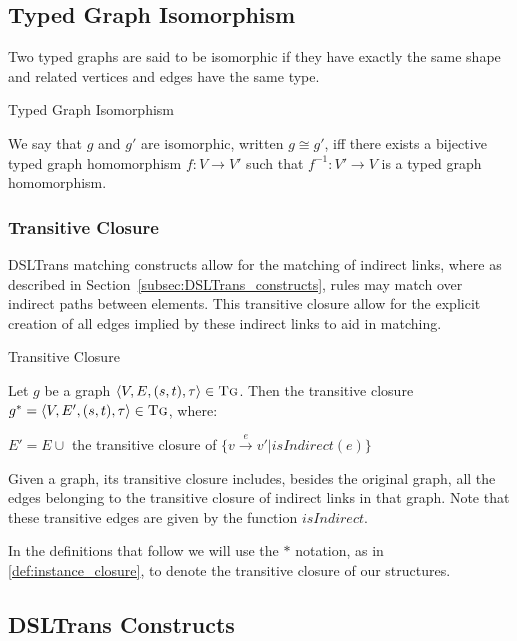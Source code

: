 \subsection*{Typed Graph Isomorphism}
Two typed graphs are said to be isomorphic if they have exactly the same shape and related vertices and edges have the same type.


\begin{definition}{Typed Graph Isomorphism\\}
\label{def:typed_graph_isomorphism}

We say that $g$ and $g'$ are isomorphic, written $g\cong g'$, iff there exists a bijective typed graph homomorphism $f:V\rightarrow V'$ such that $f^{-1}:V'\rightarrow V$ is a typed graph homomorphism.
\end{definition}




\subsubsection*{Transitive Closure}

DSLTrans matching constructs allow for the matching of indirect links, where as described in Section~\ref{subsec:DSLTrans_constructs}, rules may match over indirect paths between elements. This transitive closure allow for the explicit creation of all edges implied by these indirect links to aid in matching.


\begin{definition}{Transitive Closure\\}
\label{def:instance_closure}

Let $g$ be a graph $\langle V,E,(s, t),\tau\rangle \in \textsc{Tg}$. Then the transitive closure $g^{*} = \langle V,E',(s, t),\tau\rangle \in \textsc{Tg}$, where:

$E' = E \cup $ the transitive closure of $\big\{v\xrightarrow{e}v' | \mathit{isIndirect(e)} \big\}$
\end{definition}


Given a graph, its transitive closure includes, besides the original graph, all the edges belonging to the transitive closure of indirect links in that graph. Note that these transitive edges are given by the function $\mathit{isIndirect}$.

In the definitions that follow we will use the $*$ notation, as in \cref{def:instance_closure}, to denote the transitive closure of our structures.


\subsection{DSLTrans Constructs}
\label{sec:DSLTrans_formal}



